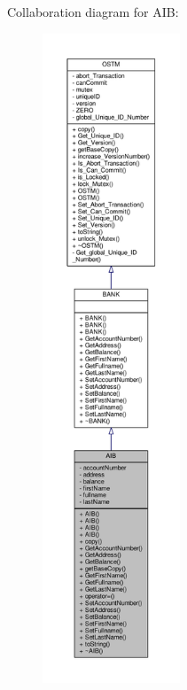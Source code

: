 Collaboration diagram for A\+IB\+:\nopagebreak
\begin{figure}[H]
\begin{center}
\leavevmode
\includegraphics[height=550pt]{class_a_i_b__coll__graph}
\end{center}
\end{figure}
